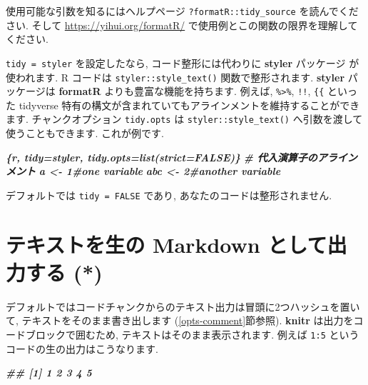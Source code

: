 \documentclass[
  11pt,
  lualatex,ja=standard,jafont=noto]{bxjsreport}
\newenvironment{Shaded}{\begin{snugshade}}{\end{snugshade}}
\newcommand{\InformationTok}[1]{\textcolor[rgb]{0.56,0.35,0.01}{\textbf{\textit{#1}}}}
\begin{document}
使用可能な引数を知るにはヘルプページ \texttt{?formatR::tidy\_source} を読んでください. そして \url{https://yihui.org/formatR/} で使用例とこの関数の限界を理解してください.

\texttt{tidy = styler} を設定したなら, コード整形には代わりに \textbf{styler} パッケージ \autocite{R-styler} が使われます. R コードは \texttt{styler::style\_text()} 関数で整形されます. \textbf{styler} パッケージは \textbf{formatR} よりも豊富な機能を持ちます. 例えば, \texttt{\%\textgreater{}\%}, \texttt{!!}, \texttt{\{\{} といった tidyverse 特有の構文が含まれていてもアラインメントを維持することができます. チャンクオプション \texttt{tidy.opts} は \texttt{styler::style\_text()} へ引数を渡して使うこともできます. これが例です.

\begin{Shaded}
\begin{Highlighting}[]
\InformationTok{\textasciigrave{}\textasciigrave{}\textasciigrave{}\{r, tidy=\textquotesingle{}styler\textquotesingle{}, tidy.opts=list(strict=FALSE)\}}
\InformationTok{\# 代入演算子のアラインメント}
\InformationTok{a   \textless{}{-} 1\#one variable}
\InformationTok{abc \textless{}{-} 2\#another variable}
\InformationTok{\textasciigrave{}\textasciigrave{}\textasciigrave{}}
\end{Highlighting}
\end{Shaded}

デフォルトでは \texttt{tidy = FALSE} であり, あなたのコードは整形されません.

\hypertarget{results-asis}{%
\section{テキストを生の Markdown として出力する (*)}\label{results-asis}}

デフォルトではコードチャンクからのテキスト出力は冒頭に2つハッシュを置いて, テキストをそのまま書き出します (\ref{opts-comment}節参照). \textbf{knitr} は出力をコードブロックで囲むため, テキストはそのまま表示されます. 例えば \texttt{1:5} というコードの生の出力はこうなります.

\begin{Shaded}
\begin{Highlighting}[]
\InformationTok{\textasciigrave{}\textasciigrave{}\textasciigrave{}}
\InformationTok{\#\# [1] 1 2 3 4 5}
\InformationTok{\textasciigrave{}\textasciigrave{}\textasciigrave{}}
\end{Highlighting}
\end{Shaded}
\end{document}
